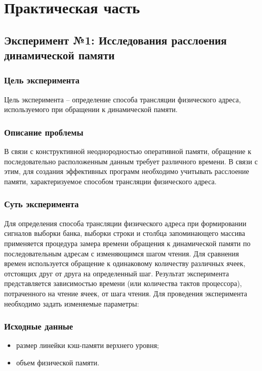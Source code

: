 \chapter{Практическая часть}

\section{Эксперимент №1: Исследования расслоения динамической памяти}

\subsection*{Цель эксперимента}

Цель эксперимента -- определение способа трансляции физического адреса,
используемого при обращении к динамической памяти.

\subsection*{Описание проблемы}

В связи с конструктивной неоднородностью оперативной памяти, обращение к последовательно расположенным данным требует различного времени. В связи с этим, для создания эффективных программ необходимо учитывать расслоение памяти, характеризуемое способом трансляции физического адреса. 

\subsection*{Суть эксперимента}

Для определения способа трансляции физического адреса при формировании сигналов выборки банка, выборки строки и столбца запоминающего массива применяется процедура замера времени обращения к динамической памяти по последовательным адресам с изменяющимся шагом чтения. Для сравнения времен
используется обращение к одинаковому количеству различных ячеек, отстоящих друг от друга на определенный шаг. Результат эксперимента представляется зависимостью времени (или количества тактов процессора), потраченного на чтение ячеек, от шага чтения. Для проведения эксперимента необходимо задать изменяемые параметры:

\subsection*{Исходные данные}

\begin{itemize}[label*=--]
	\item размер линейки кэш-памяти верхнего уровня;
	\item объем физической памяти.
\end{itemize}


